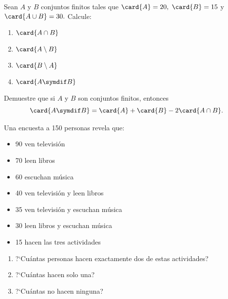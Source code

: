 \begin{problema}
	Sean $A$ y $B$ conjuntos finitos tales que $\card{A} = 20,$ $\card{B} = 15$ y $\card{A \cup B} = 30.$ Calcule:
	\begin{enumerate}
		\item $\card{A \cap B}$
		\item $\card{A \setminus B}$
		\item $\card{B \setminus A}$
		\item $\card{A \symdif B}$
	\end{enumerate}
\end{problema}

\begin{problema}
	Demuestre que si $A$ y $B$ son conjuntos finitos, entonces
	$$
	\card{A \symdif B} = \card{A} + \card{B} - 2\card{A \cap B}.
	$$
\end{problema}

\begin{problema}
	Una encuesta a 150 personas revela que:
	\begin{itemize}
		\item 90 ven televisión
		\item 70 leen libros
		\item 60 escuchan música
		\item 40 ven televisión y leen libros
		\item 35 ven televisión y escuchan música
		\item 30 leen libros y escuchan música
		\item 15 hacen las tres actividades
	\end{itemize}
	\begin{enumerate}
		\item ?`Cuántas personas hacen exactamente dos de estas actividades?
		\item ?`Cuántas hacen solo una?
		\item ?`Cuántas no hacen ninguna?
	\end{enumerate}
\end{problema}